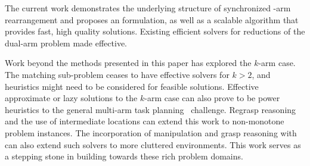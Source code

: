 The current work demonstrates the underlying structure of synchronized \dual-arm rearrangement and proposes an \milp formulation, as well as a scalable algorithm \algo that provides fast, high quality solutions. Existing efficient solvers for reductions of the dual-arm problem made \algo effective. 

\cameraready
{
Work beyond the methods presented in this paper has explored the $k$-arm case. The matching sub-problem ceases to have effective solvers for $k>2$, and heuristics might need to be considered for feasible solutions. Effective approximate or lazy solutions to the $k$-arm case can also prove to be power heuristics to the general multi-arm task planning~\cite{shome2019multiarm} challenge. Regrasp reasoning and the use of intermediate locations can extend this work to non-monotone problem instances. The incorporation of manipulation and grasp reasoning with  can also extend such solvers to more cluttered environments. This work serves as a stepping stone in building towards these rich problem domains.
}

